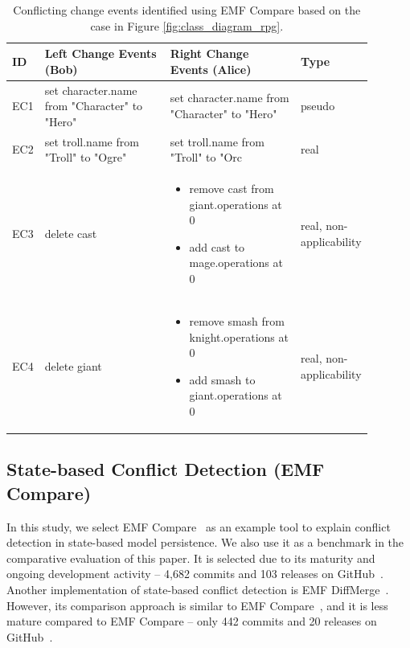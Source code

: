\begin{table}[ht]
\centering
\caption{Conflicting change events identified using EMF Compare based on the case in Figure \ref{fig:class_diagram_rpg}.}
\label{table:emfc_conflicts}
\begin{tabular}{|p{0.04\linewidth}|p{0.37\linewidth}|p{0.37\linewidth}|
		p{0.11\linewidth}|}
	\hline
	\textbf{ID} & 
	\textbf{Left Change Events (Bob)} & 
	\textbf{Right Change Events (Alice)} & 
	\textbf{Type}\\ 
	\hline
	EC1 & 
	set character.name from "Character" to "Hero" & 
	set character.name from "Character" to "Hero" & 
	pseudo \\
	\hline
	EC2 & set troll.name from "Troll" to "Ogre" & 
	set troll.name from "Troll" to "Orc & 
	real \\ 
	\hline
	EC3 & 
	delete cast
	& 
	\begin{minipage}[t]{\linewidth}
		\raggedright
		\begin{itemize}[leftmargin=0pt]
			\setlength
			\item[] remove cast from giant.operations at 0
			\item[] add cast to mage.operations at 0
		\end{itemize}
	\end{minipage}
	& 
	real, non-applicability\\
	\hline
	EC4 & 
	delete giant
	& 
	\begin{minipage}[t]{\linewidth}
		\raggedright
		\begin{itemize}[leftmargin=0pt]
			\setlength
			\item[] remove smash from knight.operations at 0
			\item[] add smash to giant.operations at 0
		\end{itemize}
	\end{minipage}
	& 
	real, non-applicability\\
	\hline
\end{tabular}
\end{table}

\subsection{State-based Conflict Detection (EMF Compare)}
\label{sec:emfcompare_conflict_detection}

In this study, we select EMF Compare~\cite{emfcompare2018developer} as an example tool to explain conflict detection in state-based model persistence. We also use it as a benchmark in the comparative evaluation of this paper. It is selected due to its maturity and ongoing development activity -- 4,682 commits and 103 releases on GitHub~\cite{github2019emfcompare}. Another implementation of state-based conflict detection is EMF DiffMerge~\cite{eclipse2019emfdiffmerge}. However, its comparison approach is similar to EMF Compare~\cite{eclipse2019emfdiffmerge}, and it is less mature compared to EMF Compare -- only 442 commits and 20 releases on GitHub~\cite{github2019emfdiffmerge}.

